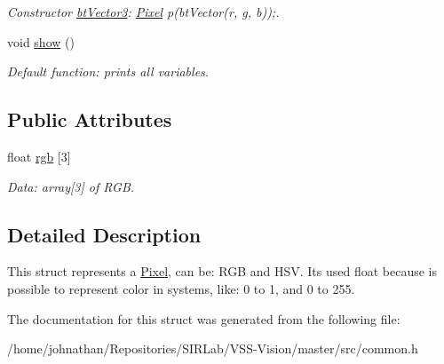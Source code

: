 \begin{DoxyCompactItemize}
\begin{DoxyCompactList}\small\item\em Constructor \hyperlink{structcommon_1_1btVector3}{bt\+Vector3}\+: \hyperlink{structcommon_1_1Pixel}{Pixel} p(bt\+Vector(r, g, b));. \end{DoxyCompactList}\item 
void \hyperlink{structcommon_1_1Pixel_a384d642e3fb610b38c813ff6fd8c50e1}{show} ()\hypertarget{structcommon_1_1Pixel_a384d642e3fb610b38c813ff6fd8c50e1}{}\label{structcommon_1_1Pixel_a384d642e3fb610b38c813ff6fd8c50e1}

\begin{DoxyCompactList}\small\item\em Default function\+: prints all variables. \end{DoxyCompactList}\end{DoxyCompactItemize}
\subsection*{Public Attributes}
\begin{DoxyCompactItemize}
\item 
float \hyperlink{structcommon_1_1Pixel_abf3e7070359fa300aeed9af22c74f118}{rgb} \mbox{[}3\mbox{]}\hypertarget{structcommon_1_1Pixel_abf3e7070359fa300aeed9af22c74f118}{}\label{structcommon_1_1Pixel_abf3e7070359fa300aeed9af22c74f118}

\begin{DoxyCompactList}\small\item\em Data\+: array\mbox{[}3\mbox{]} of R\+GB. \end{DoxyCompactList}\end{DoxyCompactItemize}


\subsection{Detailed Description}
This struct represents a \hyperlink{structcommon_1_1Pixel}{Pixel}, can be\+: R\+GB and H\+SV. It\textquotesingle{}s used float because is possible to represent color in systems, like\+: 0 to 1, and 0 to 255. 

The documentation for this struct was generated from the following file\+:\begin{DoxyCompactItemize}
\item 
/home/johnathan/\+Repositories/\+S\+I\+R\+Lab/\+V\+S\+S-\/\+Vision/master/src/common.\+h\end{DoxyCompactItemize}
